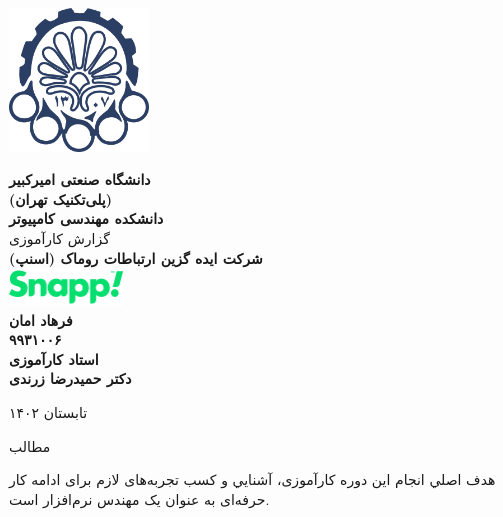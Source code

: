 \documentclass[a4]{report}
\begin{document}
\setLTRbibitems{}

\begin{titlepage}\begin{center}
    \vspace{1cm}
    \includegraphics[height=3.8cm]{fig/fa-logo}

    \vspace{1cm}
    {
        \bfseries{\large دانشگاه صنعتی امیرکبیر}\\
        \normalsize(پلی‌تکنیک تهران)\\
        \large دانشکده مهندسی کامپیوتر\\
    }
    \vspace{1cm}
    {
      \large
        گزارش کارآموزی\\
    }
    \vspace{1cm}
    {
      \bfseries\Large
      شرکت ایده گزین ارتباطات روماک (اسنپ)\\
    }
    \vspace{0.8cm}
    \includegraphics[height=1cm]{fig/snapp}\\
    \vspace{0.8cm}
    {
      \bfseries\large
      فرهاد امان\\
      ۹۹۳۱۰۰۶\\
    }
    \vspace{0.8cm}
    {
      \bfseries\large
      استاد کارآموزی\\
      دکتر حمیدرضا زرندی \\
    }



    \vfill
    {\fontsize{16pt}{17pt} تابستان ۱۴۰۲}
\end{center}\end{titlepage}
\newpage

‌مطالب

هدف اصلي انجام این دوره کارآموزی، آشنایي و کسب تجربه‌های لازم برای ادامه کار حرفه‌ای به
عنوان یک مهندس نرم‌افزار است.
\end{document}
